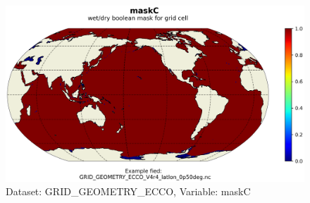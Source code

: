 \begin{figure}[H]
\centering
\includegraphics[scale=0.55]{../images/plots/latlon_plots_coords/Geometry_Parameters_for_the_0.5_degree_Lat-Lon_Model_Grid_(Version_4_Release_4)/maskC.png}
\caption{Dataset: GRID\_GEOMETRY\_ECCO, Variable: maskC}
\label{tab:table-GRID_GEOMETRY_ECCO_maskC-Plot}
\end{figure}